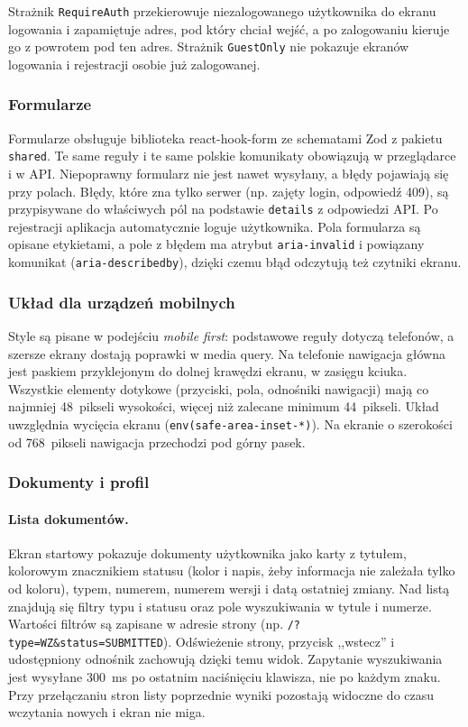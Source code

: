 Strażnik \texttt{RequireAuth} przekierowuje niezalogowanego użytkownika do
ekranu logowania i zapamiętuje adres, pod który chciał wejść, a po zalogowaniu
kieruje go z powrotem pod ten adres. Strażnik \texttt{GuestOnly} nie pokazuje
ekranów logowania i rejestracji osobie już zalogowanej.

\subsubsection{Formularze}

Formularze obsługuje biblioteka react-hook-form ze schematami Zod
z pakietu \texttt{shared}. Te same reguły i te same polskie komunikaty
obowiązują w przeglądarce i w API. Niepoprawny formularz nie jest nawet
wysyłany, a błędy pojawiają się przy polach. Błędy, które zna tylko serwer
(np. zajęty login, odpowiedź 409), są przypisywane do właściwych pól na
podstawie \texttt{details} z odpowiedzi API. Po rejestracji aplikacja
automatycznie loguje użytkownika. Pola formularza są opisane etykietami,
a pole z błędem ma atrybut \texttt{aria-invalid} i powiązany komunikat
(\texttt{aria-describedby}), dzięki czemu błąd odczytują też czytniki ekranu.

\subsubsection{Układ dla urządzeń mobilnych}

Style są pisane w podejściu \emph{mobile first}: podstawowe reguły dotyczą
telefonów, a szersze ekrany dostają poprawki w media query. Na telefonie
nawigacja główna jest paskiem przyklejonym do dolnej krawędzi ekranu, w zasięgu
kciuka. Wszystkie elementy dotykowe (przyciski, pola, odnośniki nawigacji) mają
co najmniej 48~pikseli wysokości, więcej niż zalecane minimum 44~pikseli.
Układ uwzględnia wycięcia ekranu (\texttt{env(safe-area-inset-*)}). Na ekranie
o szerokości od 768~pikseli nawigacja przechodzi pod górny pasek.

\subsubsection{Dokumenty i profil}

\paragraph{Lista dokumentów.} Ekran startowy pokazuje dokumenty użytkownika
jako karty z tytułem, kolorowym znacznikiem statusu (kolor i napis, żeby
informacja nie zależała tylko od koloru), typem, numerem, numerem wersji i datą
ostatniej zmiany. Nad listą znajdują się filtry typu i statusu oraz pole
wyszukiwania w tytule i numerze. Wartości filtrów są zapisane w adresie
strony (np. \texttt{/?type=WZ\&status=SUBMITTED}). Odświeżenie strony,
przycisk ,,wstecz'' i udostępniony odnośnik zachowują dzięki temu widok.
Zapytanie wyszukiwania jest wysyłane 300~ms po ostatnim naciśnięciu klawisza,
nie po każdym znaku. Przy przełączaniu stron listy poprzednie wyniki pozostają
widoczne do czasu wczytania nowych i ekran nie miga.

